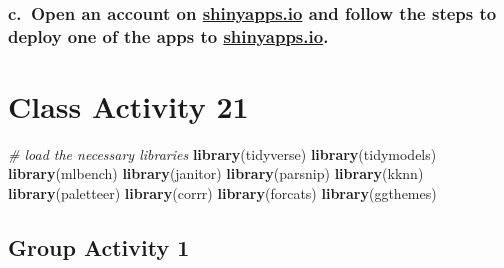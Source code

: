 \documentclass[
]{book}
\newenvironment{Shaded}{\begin{snugshade}}{\end{snugshade}}
\newcommand{\CommentTok}[1]{\textcolor[rgb]{0.56,0.35,0.01}{\textit{#1}}}
\newcommand{\FunctionTok}[1]{\textcolor[rgb]{0.13,0.29,0.53}{\textbf{#1}}}
\newcommand{\NormalTok}[1]{#1}
\begin{document}
\hypertarget{c.-open-an-account-on-shinyapps.io-and-follow-the-steps-to-deploy-one-of-the-apps-to-shinyapps.io.}{%
\subsection{\texorpdfstring{c.~Open an account on \href{https://www.shinyapps.io/admin/\#/dashboard}{shinyapps.io} and follow the steps to deploy one of the apps to \href{https://www.shinyapps.io/admin/\#/dashboard}{shinyapps.io}.}{c.~Open an account on shinyapps.io and follow the steps to deploy one of the apps to shinyapps.io.}}\label{c.-open-an-account-on-shinyapps.io-and-follow-the-steps-to-deploy-one-of-the-apps-to-shinyapps.io.}}

\hypertarget{class-activity-21}{%
\chapter{Class Activity 21}\label{class-activity-21}}

\begin{Shaded}
\begin{Highlighting}[]
\CommentTok{\# load the necessary libraries}
\FunctionTok{library}\NormalTok{(tidyverse) }
\FunctionTok{library}\NormalTok{(tidymodels)}
\FunctionTok{library}\NormalTok{(mlbench)     }
\FunctionTok{library}\NormalTok{(janitor)}
\FunctionTok{library}\NormalTok{(parsnip)}
\FunctionTok{library}\NormalTok{(kknn)}
\FunctionTok{library}\NormalTok{(paletteer)}
\FunctionTok{library}\NormalTok{(corrr)}
\FunctionTok{library}\NormalTok{(forcats)}
\FunctionTok{library}\NormalTok{(ggthemes)}
\end{Highlighting}
\end{Shaded}

\hypertarget{group-activity-1-6}{%
\section{Group Activity 1}\label{group-activity-1-6}}
\end{document}
